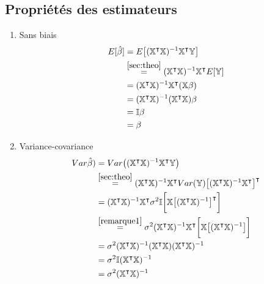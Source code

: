 \documentclass[11pt,french]{report}
\begin{document}
\subsection*{Propriétés des estimateurs}
\begin{enumerate}
\item Sans biais
\begin{align*}
E[\hat{\beta}] &= E\big[ (\mathbb{X}^\intercal\mathbb{X})^{-1}\mathbb{X}^\intercal\mathbb{Y} \big] \\
&\overset{\ref{sec:theo}}{=} (\mathbb{X}^\intercal\mathbb{X})^{-1}\mathbb{X}^\intercal E[\mathbb{Y}] \\
&= (\mathbb{X}^\intercal\mathbb{X})^{-1}\mathbb{X}^\intercal (\mathbb{X}\beta) \\
&= (\mathbb{X}^\intercal\mathbb{X})^{-1}(\mathbb{X}^\intercal\mathbb{X}) \beta \\
&= \mathbb{I} \beta \\
&= \beta \\
\end{align*}
\item Variance-covariance
\begin{align*}
Var\hat{\beta}) &= Var\big((\mathbb{X}^\intercal\mathbb{X})^{-1}\mathbb{X}^\intercal\mathbb{Y} \big) \\
&\overset{\ref{sec:theo}}{=} (\mathbb{X}^\intercal\mathbb{X})^{-1}\mathbb{X}^\intercal Var(\mathbb{Y}) \big[ (\mathbb{X}^\intercal\mathbb{X})^{-1}\mathbb{X}^\intercal \big]^\intercal \\
&= (\mathbb{X}^\intercal\mathbb{X})^{-1}\mathbb{X}^\intercal \sigma^2 \mathbb{I} \bigg[ \mathbb{X} \big[(\mathbb{X}^\intercal\mathbb{X})^{-1} \big]^\intercal \bigg] \\
& \overset{\ref{remarque1}}{=}\sigma^2 (\mathbb{X}^\intercal\mathbb{X})^{-1} \mathbb{X}^\intercal \bigg[ \mathbb{X} \big[(\mathbb{X}^\intercal\mathbb{X})^{-1} \big] \bigg] \\
&= \sigma^2 (\mathbb{X}^\intercal\mathbb{X})^{-1} (\mathbb{X}^\intercal\mathbb{X}) (\mathbb{X}^\intercal\mathbb{X})^{-1} \\
&= \sigma^2 \mathbb{I} (\mathbb{X}^\intercal\mathbb{X})^{-1} \\
&= \sigma^2 (\mathbb{X}^\intercal\mathbb{X})^{-1} \\
\end{align*}
\end{enumerate}
\end{document}
